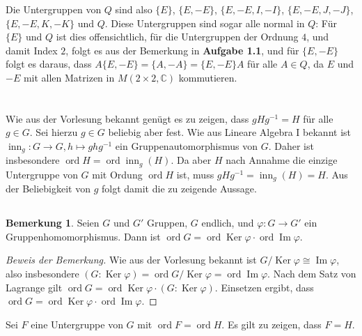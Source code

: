 \documentclass[a4paper,10pt]{article}
\theoremstyle{definition}
\newtheorem*{bem}{Bemerkung}
\newcommand{\C}{\mathbb{C}}
\newcommand{\ord}{\operatorname{ord}}
\newcommand{\inn}{\operatorname{inn}}
\newcommand{\Img}{\operatorname{Im}}
\newcommand{\Ker}{\operatorname{Ker}}
\begin{document}
Die Untergruppen von $Q$ sind also $\{E\}$, $\{E,-E\}$, $\{E,-E,I,-I\}$, $\{E,-E,J,-J\}$, $\{E,-E,K,-K\}$ und $Q$. Diese Untergruppen sind sogar alle normal in $Q$: Für $\{E\}$ und $Q$ ist dies offensichtlich, für die Untergruppen der Ordnung $4$, und damit Index $2$, folgt es aus der Bemerkung in \textbf{Aufgabe 1.1}, und für $\{E,-E\}$ folgt es daraus, dass $A\{E,-E\} = \{A,-A\} = \{E,-E\}A$ für alle $A \in Q$, da $E$ und $-E$ mit allen Matrizen in $M(2 \times 2, \C)$ kommutieren.





\section{}


\subsection{}
Wie aus der Vorlesung bekannt genügt es zu zeigen, dass $gHg^{-1} = H$ für alle $g \in G$. Sei hierzu $g \in G$ beliebig aber fest. Wie aus Lineare Algebra I bekannt ist $\inn_g : G \rightarrow G, h \mapsto ghg^{-1}$ ein Gruppenautomorphismus von $G$. Daher ist insbesondere $\ord H = \ord \inn_g(H)$. Da aber $H$ nach Annahme die einzige Untergruppe von $G$ mit Ordung $\ord H$ ist, muss $gHg^{-1} = \inn_g(H) = H$. Aus der Beliebigkeit von $g$ folgt damit die zu zeigende Aussage.


\subsection{}
\begin{bem}
 Seien $G$ und $G'$ Gruppen, $G$ endlich, und $\varphi : G \rightarrow G'$ ein Gruppenhomomorphismus. Dann ist $\ord G = \ord \Ker \varphi \cdot \ord \Img \varphi$.
\end{bem}
\begin{proof}[Beweis der Bemerkung]
 Wie aus der Vorlesung bekannt ist $G/\Ker \varphi \cong \Img \varphi$, also insbesondere $(G : \Ker \varphi) = \ord G/\Ker \varphi = \ord \Img \varphi$. Nach dem Satz von Lagrange gilt $\ord G = \ord \Ker \varphi \cdot (G : \Ker \varphi)$. Einsetzen ergibt, dass \mbox{$\ord G = \ord \Ker \varphi \cdot \ord \Img \varphi$}.
\end{proof}

Sei $F$ eine Untergruppe von $G$ mit $\ord F = \ord H$. Es gilt zu zeigen, dass $F = H$.
\end{document}
